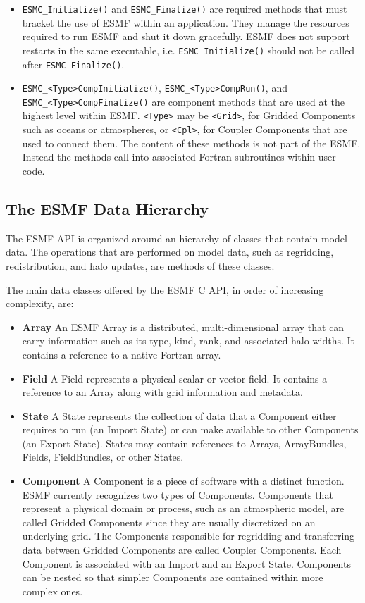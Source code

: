\begin{itemize}

\item {\tt ESMC\_Initialize()} and {\tt ESMC\_Finalize()} are required 
methods that must bracket the use of ESMF within an application.  
They manage the resources required to run ESMF and shut it down
gracefully.  ESMF does not support restarts in the same executable, i.e.
{\tt ESMC\_Initialize()} should not be called after {\tt ESMC\_Finalize()}.
\item {\tt ESMC\_<Type>CompInitialize()}, {\tt ESMC\_<Type>CompRun()}, and \newline
{\tt ESMC\_<Type>CompFinalize()} are component methods that are used at the 
highest level within ESMF.  {\tt <Type>} may be {\tt <Grid>}, for 
Gridded Components such as oceans or atmospheres, or
{\tt <Cpl>}, for Coupler Components that are used to connect 
them.  The content of these methods is not part of the ESMF.  
Instead the methods call into associated Fortran subroutines within 
user code.

\end{itemize}

\subsection{The ESMF Data Hierarchy}

The ESMF API is organized around an hierarchy of classes that 
contain model data.  The operations that are performed
on model data, such as regridding, redistribution, and halo 
updates, are methods of these classes.  

The main data classes offered by the ESMF C API, in order of increasing complexity, are:
\begin{itemize}
\item {\bf Array} An ESMF Array is a distributed, multi-dimensional 
array that can carry information such as its type, kind, rank, and 
associated halo widths.  It contains a reference to a native Fortran array.
\item {\bf Field}  A Field represents a physical scalar or vector field.
It contains a reference to an Array along with grid information and metadata.
\item {\bf State}  A State represents the collection of data that a 
Component either requires to run (an Import State) or can make 
available to other Components (an Export State).
States may contain references to Arrays, ArrayBundles, Fields,
FieldBundles, or other States. 
\item {\bf Component}  A Component is a piece of software 
with a distinct function.  ESMF currently recognizes two types 
of Components.  Components that represent a physical domain 
or process, such 
as an atmospheric model, are called Gridded Components since they are 
usually discretized on an underlying grid.  The Components 
responsible for regridding and transferring data between Gridded 
Components are called Coupler Components.  Each Component
is associated with an Import and an Export State.  Components
can be nested so that simpler Components are contained within more
complex ones.

\end{itemize}

